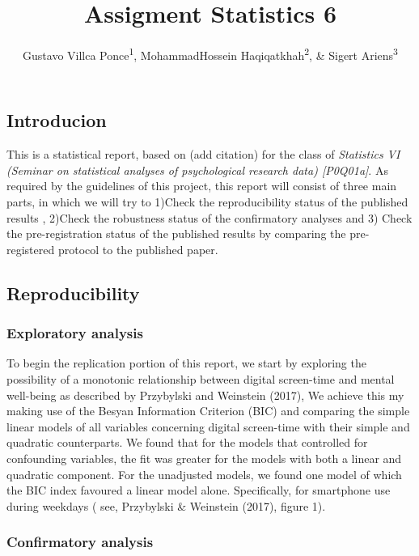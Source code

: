 \documentclass[floatsintext,man]{apa6}
\title{Assigment Statistics 6}
\author{Gustavo Villca Ponce\textsuperscript{1}, MohammadHossein Haqiqatkhah\textsuperscript{2}, \& Sigert Ariens\textsuperscript{3}}
\affiliation{
    \vspace{0.5cm}
          \textsuperscript{1} student number:r0292033\\
          \textsuperscript{2} student number:r0607671\\
          \textsuperscript{3} student number:  }
\theoremstyle{definition}
\theoremstyle{definition}
\theoremstyle{definition}
\theoremstyle{remark}
\begin{document}
\maketitle

\setcounter{secnumdepth}{0}



\hypertarget{introducion}{%
\subsection{Introducion}\label{introducion}}

This is a statistical report, based on (add citation) for the class of
\emph{Statistics VI (Seminar on statistical analyses of psychological
research data) {[}P0Q01a{]}}. As required by the guidelines of this
project, this report will consist of three main parts, in which we will
try to 1)Check the reproducibility status of the published results ,
2)Check the robustness status of the confirmatory analyses and 3) Check
the pre-registration status of the published results by comparing the
pre-registered protocol to the published paper.

\hypertarget{reproducibility}{%
\subsection{Reproducibility}\label{reproducibility}}

\hypertarget{exploratory-analysis}{%
\subsubsection{Exploratory analysis}\label{exploratory-analysis}}

To begin the replication portion of this report, we start by exploring
the possibility of a monotonic relationship between digital screen-time
and mental well-being as described by Przybylski and Weinstein (2017),
We achieve this my making use of the Besyan Information Criterion (BIC)
and comparing the simple linear models of all variables concerning
digital screen-time with their simple and quadratic counterparts. We
found that for the models that controlled for confounding variables, the
fit was greater for the models with both a linear and quadratic
component. For the unadjusted models, we found one model of which the
BIC index favoured a linear model alone. Specifically, for smartphone
use during weekdays ( see, Przybylski \& Weinstein (2017), figure 1).

\hypertarget{confirmatory-analysis}{%
\subsubsection{Confirmatory analysis}\label{confirmatory-analysis}}
\end{document}
